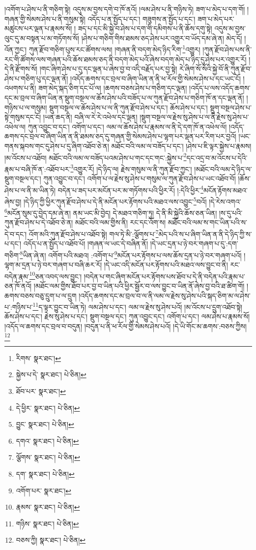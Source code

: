 །འགོག་པ་ཤེས་པ་ནི་གཅིག་སྟེ། འདུས་མ་བྱས་དགེ་བ་ཁོ་ནའོ། །ལམ་ཤེས་པ་ནི་གཉིས་ཏེ། ཟག་པ་མེད་པ་དག་གོ། །གཞན་གྱི་སེམས་ཤེས་པ་ནི་གསུམ་སྟེ། འདོད་པ་ན་སྤྱོད་པ་དང་། གཟུགས་ན་སྤྱོད་པ་དང་། ཟག་པ་མེད་པར་མཚུངས་པར་ལྡན་པ་རྣམས་སོ། །
ཟད་པ་དང་མི་སྐྱེ་བ་ཤེས་པ་དག་གི་དམིགས་པ་ནི་ཆོས་དགུ་སྟེ། འདུས་མ་བྱས་ལུང་དུ་མ་བསྟན་པ་མ་གཏོགས་སོ། །ཤེས་པ་གཅིག་གིས་ཐམས་ཅད་ཤེས་པར་འགྱུར་བ་ཡོད་དམ་ཞེ་ན། མེད་དོ། །འོན་ཀྱང་། ཀུན་རྫོབ་གཅིག་པུས་རང་ཚོགས་ལས། །གཞན་ནི་བདག་མེད་ཉིད་རིག་\footnote{རིགས་  སྣར་ཐང་། }འགྱུར། །ཀུན་རྫོབ་ཤེས་པས་ནི་རང་གི་ཚོགས་ལས་གཞན་པའི་ཆོས་ཐམས་ཅད་ནི་བདག་མེད་པའོ་ཞེས་བདག་མེད་པ་ཉིད་དུ་ཤེས་པར་འགྱུར་རོ། །དེ་ནི་རྫོགས་སོ། །གང་ཞིག་ཤེས་པ་དུ་དང་ལྡན་པ་ཞེས་བྱ་བ་འདི་བརྗོད་པར་བྱ་སྟེ། རེ་ཞིག་སོ་སོའི་སྐྱེ་བོ་ནི་ཀུན་རྫོབ་ཤེས་པ་གཅིག་པུ་དང་ལྡན་ནོ། །འདོད་ཆགས་དང་བྲལ་བ་ཞིག་ཡིན་ན་ནི་ཕ་རོལ་གྱི་སེམས་ཤེས་པ་དང་ཡང་ངོ། །འཕགས་པ་ནི། ཟག་མེད་སྐད་ཅིག་དང་པོ་ལ། །ཆགས་བཅས་ཤེས་པ་གཅིག་དང་ལྡན། །འདོད་པ་ལས་འདོད་ཆགས་དང་མ་བྲལ་བ་ཞིག་ཡིན་ན་སྡུག་བསྔལ་ལ་ཆོས་ཤེས་པའི་བཟོད་པ་ལ་ཀུན་རྫོབ་ཤེས་པ་གཅིག་ཁོ་ན་དང་ལྡན་ནོ། །གཉིས་པ་ལ་གསུམ། སྡུག་བསྔལ་ལ་ཆོས་ཤེས་པ་ལ་ནི་ཀུན་རྫོབ་ཤེས་པ་དང་། ཆོས་ཤེས་པ་དང་། སྡུག་བསྔལ་ཤེས་པ་སྟེ་གསུམ་དང་ངོ། །ཡན་ཆད་ནི། བཞི་ལ་རེ་རེ་འཕེལ་དང་ལྡན། །སྡུག་བསྔལ་ལ་རྗེས་སུ་ཤེས་པ་ལ་ནི་རྗེས་སུ་ཤེས་པ་འཕེལ་ལ། ཀུན་འབྱུང་བ་དང་། འགོག་པ་དང་། ལམ་ལ་ཆོས་ཤེས་པ་རྣམས་ལ་ནི་དེ་དག་ཁོ་ན་འཕེལ་ལོ། །འདོད་ཆགས་དང་བྲལ་བ་ཞིག་ཡིན་ན་ནི་ཐམས་ཅད་དུ་གཞན་གྱི་སེམས་ཤེས་པ་ལྷག་པར་ལྡན་པར་རིག་པར་བྱའོ། །ཡང་གནས་སྐབས་གང་དུ་ཤེས་པ་དུ་ཞིག་འཐོབ་ཅེ་ན། མཐོང་བའི་ལམ་ལ་བཟོད་པ་དང་། །ཤེས་པ་ཇི་ལྟར་སྐྱེས་པ་རྣམས། །མ་འོངས་པ་འཐོབ། མཐོང་བའི་ལམ་ལ་བཟོད་པའམ་ཤེས་པ་གང་དང་གང་:སྐྱེས་པ་\footnote{སྐྱེས་པ་དེ་  སྣར་ཐང་།  པེ་ཅིན། }དང་འདྲ་བ་མ་འོངས་པ་དེའི་རྣམ་པ་བཞི་ཁོ་ན་:འཐོབ་པར་\footnote{ཐོབ་པར་  སྣར་ཐང་། }འགྱུར་རོ། །དེ་ཉིད་ལ། རྗེས་གསུམ་ལ་ནི་ཀུན་རྫོབ་ཀྱང་། །མཐོང་བའི་ལམ་དེ་ཉིད་ལ་སྡུག་བསྔལ་དང་། ཀུན་འབྱུང་བ་དང་། འགོག་པ་ལ་རྗེས་སུ་ཤེས་པ་གསུམ་ལ་ཀུན་རྫོབ་ཤེས་པ་ཡང་འཐོབ་བོ། །ཆོས་ཤེས་པ་ལ་ནི་མ་ཡིན་ཏེ། བདེན་པ་ཟད་པར་མངོན་པར་མ་གཏོགས་པའི་ཕྱིར་རོ། །:དེའི་ཕྱིར་\footnote{དེ་ཕྱིར་  སྣར་ཐང་།  པེ་ཅིན། }མངོན་རྟོགས་མཐའ་ཞེས་བྱ། །དེ་ཉིད་ཀྱི་ཕྱིར་ཀུན་རྫོབ་ཤེས་པ་དེ་ནི་མངོན་པར་རྟོགས་པའི་མཐའ་ལས་འབྱུང་\footnote{བྱུང་  སྣར་ཐང་།  པེ་ཅིན། }བའོ། །དེ་རེས་འགའ་\footnote{དགའ་  སྣར་ཐང་།  པེ་ཅིན། }མངོན་སུམ་དུ་བྱེད་དམ་ཞེ་ན། ནམ་ཡང་མི་བྱེད། དེ་མཐའ་གཅིག་ཏུ། དེ་ནི་མི་སྐྱེའི་ཆོས་ཅན་ཡིན། །ས་དུ་པའི་ཀུན་རྫོབ་ཤེས་པ་དེ་འཐོབ་ཅེ་ན། མཐོང་བའི་ལམ་གྱིས་ནི། རང་དང་འོག་ས། མཐོང་བའི་ལམ་ས་གང་ཡིན་པའི་ས་དེ་བ་དང་། འོག་མའི་ཀུན་རྫོབ་ཤེས་པ་འཐོབ་སྟེ། གལ་ཏེ་མི་:ལྕོགས་པ་\footnote{ལྕོགས་  སྣར་ཐང་།  པེ་ཅིན། }མེད་པའི་ས་པ་ཞིག་ཡིན་ན་ནི་དེ་ཉིད་ཀྱི་ས་པ་དང་། འདོད་པ་ན་སྤྱོད་པ་འཐོབ་པོ། །གཞན་ལ་ཡང་དེ་བཞིན་ནོ། །དེ་ཡང་དྲན་པ་ཉེ་བར་གཞག་པ་དུ་:དག་གཅིག་\footnote{དག་  སྣར་ཐང་།  པེ་ཅིན། }ཡིན་ཞེ་ན། འགོག་པའི་མཐའ། :འགོག་པ་\footnote{འགོག་པར་  སྣར་ཐང་། }མངོན་པར་རྟོགས་པ་ལས་ཆོས་དྲན་པ་ཉེ་བར་གཞག་པའོ། །ལྷག་མ་དྲན་པ་ཉེ་བར་གཞག་པ་བཞི་ཆར་རོ། །དེ་ཡང་འདི་མངོན་པར་རྟོགས་པའི་མཐའ་ལས་བྱུང་བ་ནི། རང་བདེན་རྣམ་\footnote{རྣམས་  སྣར་ཐང་།  པེ་ཅིན། }ཅན་འབད་ལས་བྱུང་། །བདེན་པ་གང་ཞིག་མངོན་པར་རྟོགས་པས་ཐོབ་པ་དེ་ནི་བདེན་པའི་རྣམ་པ་ཅན་ཁོ་ནའོ། །མཐོང་ལམ་གྱིས་ཐོབ་པར་བྱ་བ་ཡིན་པའི་ཕྱིར་སྦྱོར་བ་ལས་བྱུང་བ་ཡིན་ནོ་ཞེས་བྱ་བའི་ཐ་ཚིག་གོ། །ཆགས་བཅས་བཅུ་དྲུག་པ་ལ་དྲུག །འདོད་ཆགས་དང་མ་བྲལ་བ་ལ་ནི་ལམ་ལ་རྗེས་སུ་ཤེས་པའི་སྐད་ཅིག་མ་ལ་ཤེས་པ་:གཉིས་པ་\footnote{གཉིས་  སྣར་ཐང་།  པེ་ཅིན། }ད་ལྟར་བྱུང་བ་ཡིན་ཏེ། ལམ་ཤེས་པ་དང་། ལམ་ལ་རྗེས་སུ་ཤེས་པའོ། །མ་འོངས་པ་དྲུག་འཐོབ་སྟེ། ཆོས་ཤེས་པ་དང་། རྗེས་སུ་ཤེས་པ་དང་། སྡུག་བསྔལ་དང་། ཀུན་འབྱུང་དང་། འགོག་པ་དང་། ལམ་ཤེས་པ་རྣམས་སོ། །འདོད་ལ་ཆགས་དང་བྲལ་བ་བདུན། །བདུན་པ་ནི་ཕ་རོལ་གྱི་སེམས་ཤེས་པའོ། །དེ་ཡི་གོང་མ་ཆགས་:བཅས་ཀྱིས།\footnote{བཅས་ཀྱི།  སྣར་ཐང་།  པེ་ཅིན། } 